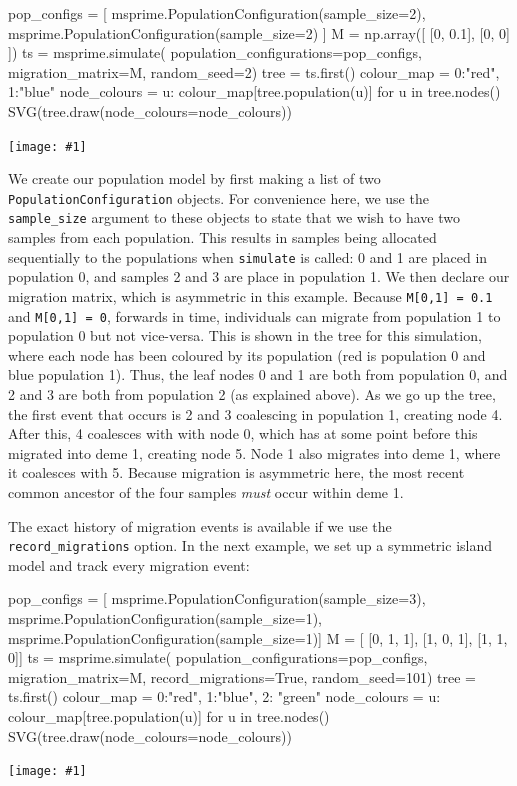 \documentclass[graybox]{svmult}
\newcommand{\includenbimage}[1]{\begin{center}\texttt{[image: \#1]}\end{center}}
\begin{document}
\begin{pythoncode}
pop_configs = [
    msprime.PopulationConfiguration(sample_size=2),
    msprime.PopulationConfiguration(sample_size=2)
]
M = np.array([
    [0, 0.1],
    [0, 0]
])
ts  = msprime.simulate(
    population_configurations=pop_configs, migration_matrix=M,
    random_seed=2)
tree = ts.first()
colour_map = {0:"red", 1:"blue"}
node_colours = {
    u: colour_map[tree.population(u)] for u in tree.nodes()}
SVG(tree.draw(node_colours=node_colours))
\end{pythoncode}

\includenbimage{images/simulations_26_0.pdf}

    We create our population model by first making a list of two
\texttt{PopulationConfiguration} objects. For convenience here, we use
the \texttt{sample\_size} argument to these objects to state that we
wish to have two samples from each population. This results in samples
being allocated sequentially to the populations when \texttt{simulate}
is called: 0 and 1 are placed in population 0, and samples 2 and 3 are
place in population 1. We then declare our migration matrix, which is
asymmetric in this example. Because \texttt{M{[}0,1{]}\ =\ 0.1} and
\texttt{M{[}0,1{]}\ =\ 0}, forwards in time, individuals can migrate
from population 1 to population 0 but not vice-versa. This is shown in
the tree for this simulation, where each node has been coloured by its
population (red is population 0 and blue population 1). Thus, the leaf
nodes 0 and 1 are both from population 0, and 2 and 3 are both from
population 2 (as explained above). As we go up the tree, the first event
that occurs is 2 and 3 coalescing in population 1, creating node 4.
After this, 4 coalesces with with node 0, which has at some point before
this migrated into deme 1, creating node 5. Node 1 also migrates into
deme 1, where it coalesces with 5. Because migration is asymmetric here,
the most recent common ancestor of the four samples \emph{must} occur
within deme 1.

The exact history of migration events is available if we use the
\texttt{record\_migrations} option. In the next example, we set up a
symmetric island model and track every migration event:

\begin{pythoncode}
pop_configs = [
    msprime.PopulationConfiguration(sample_size=3),
    msprime.PopulationConfiguration(sample_size=1),
    msprime.PopulationConfiguration(sample_size=1)]
M = [
    [0, 1, 1],
    [1, 0, 1],
    [1, 1, 0]]
ts  = msprime.simulate(
    population_configurations=pop_configs, migration_matrix=M,
    record_migrations=True, random_seed=101)
tree = ts.first()
colour_map = {0:"red", 1:"blue", 2: "green"}
node_colours = {
    u: colour_map[tree.population(u)] for u in tree.nodes()}
SVG(tree.draw(node_colours=node_colours))
\end{pythoncode}
\includenbimage{images/simulations_28_0.pdf}
\end{document}
